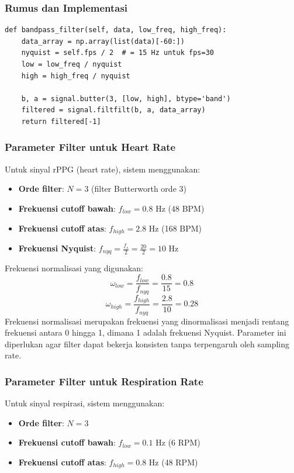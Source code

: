 \documentclass[11pt,a4paper]{article}
\begin{document}
\subsubsection{Rumus dan Implementasi}
    \begin{lstlisting}
def bandpass_filter(self, data, low_freq, high_freq):
    data_array = np.array(list(data)[-60:])
    nyquist = self.fps / 2  # = 15 Hz untuk fps=30
    low = low_freq / nyquist
    high = high_freq / nyquist
    
    b, a = signal.butter(3, [low, high], btype='band')
    filtered = signal.filtfilt(b, a, data_array)
    return filtered[-1]
    \end{lstlisting}

\subsubsection{Parameter Filter untuk Heart Rate}
Untuk sinyal rPPG (heart rate), sistem menggunakan:
\begin{itemize}
    \item \textbf{Orde filter}: $N = 3$ (filter Butterworth orde 3)
    \item \textbf{Frekuensi cutoff bawah}: $f_{low} = 0.8$ Hz (48 BPM)
    \item \textbf{Frekuensi cutoff atas}: $f_{high} = 2.8$ Hz (168 BPM)
    \item \textbf{Frekuensi Nyquist}: $f_{nyq} = \frac{f_s}{2} = \frac{20}{2} = 10$ Hz
\end{itemize}

Frekuensi normalisasi yang digunakan:
$$\omega_{low} = \frac{f_{low}}{f_{nyq}} = \frac{0.8}{15} = 0.8$$
$$\omega_{high} = \frac{f_{high}}{f_{nyq}} = \frac{2.8}{10} = 0.28$$
Frekuensi normalisasi merupakan frekuensi yang dinormalisasi menjadi rentang frekuensi antara  0 hingga 1, dimana 1 adalah frekuensi Nyquist. Parameter ini diperlukan agar filter dapat bekerja konsisten tanpa terpengaruh oleh sampling rate.

\subsubsection{Parameter Filter untuk Respiration Rate}
Untuk sinyal respirasi, sistem menggunakan:
\begin{itemize}
    \item \textbf{Orde filter}: $N = 3$
    \item \textbf{Frekuensi cutoff bawah}: $f_{low} = 0.1$ Hz (6 RPM)
    \item \textbf{Frekuensi cutoff atas}: $f_{high} = 0.8$ Hz (48 RPM)
\end{itemize}
\end{document}
